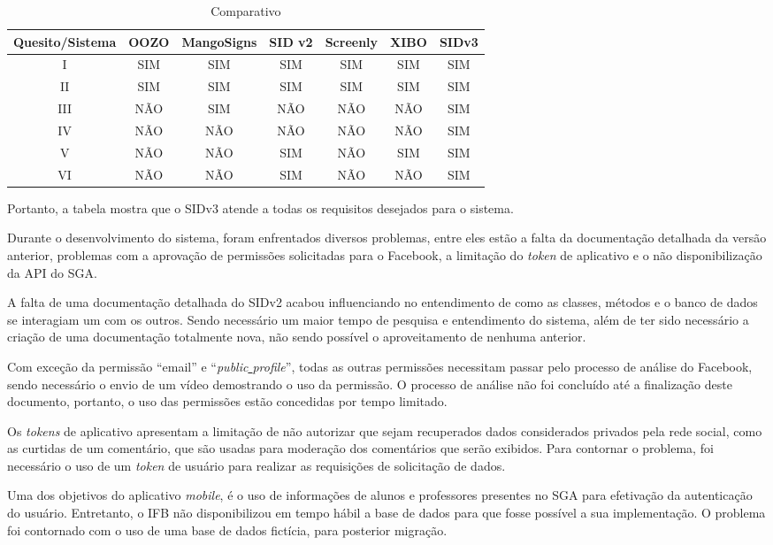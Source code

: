 \begin{table}[h!]
	\caption{Comparativo}
	\label {tlb:comparativo2}
	\centering
	\begin{tabular}{|c|c|c|c|c|c|c|}
		\hline
		Quesito/Sistema & OOZO & MangoSigns & SID v2 & Screenly & XIBO & SIDv3 \\ \hline
		I 				& SIM  & SIM		& SIM & SIM 	 & SIM	& SIM \\ \hline
		II 				& SIM  & SIM 		& SIM & SIM 	 & SIM		& SIM \\ \hline
		III				& NÃO  & SIM 		& NÃO & NÃO 	 & NÃO		& SIM \\ \hline
		IV 				& NÃO  & NÃO 		& NÃO & NÃO 	 & NÃO		& SIM \\ \hline
		V 				& NÃO  & NÃO 		& SIM & NÃO 	 & SIM		& SIM \\ \hline
		VI 				& NÃO  & NÃO 		& SIM & NÃO 	 & NÃO		& SIM \\ \hline
	\end{tabular}
\end{table}

Portanto, a tabela mostra que o SIDv3 atende a todas os requisitos desejados para o sistema.

Durante o desenvolvimento do sistema, foram enfrentados diversos problemas, entre eles estão a falta da documentação detalhada da versão anterior, problemas com a aprovação de permissões solicitadas para o Facebook, a limitação do \textit{token} de aplicativo e o não disponibilização da API do SGA.

A falta de uma documentação detalhada do SIDv2 acabou influenciando no entendimento de como as classes, métodos e o banco de dados se interagiam um com os outros. Sendo necessário um maior tempo de pesquisa e entendimento do sistema, além de ter sido necessário a criação de uma documentação totalmente nova, não sendo possível o aproveitamento de nenhuma anterior.

Com exceção da permissão ``email'' e ``\textit{public\underline{{ }}profile}'', todas as outras permissões necessitam passar pelo processo de análise do Facebook, sendo necessário o envio de um vídeo demostrando o uso da permissão. O processo de análise não foi concluído até a finalização deste documento, portanto, o uso das permissões estão concedidas por tempo limitado.

Os \textit{tokens} de aplicativo apresentam a limitação de não autorizar que sejam recuperados dados considerados privados pela rede social, como as curtidas de um comentário, que são usadas para moderação dos comentários que serão exibidos. Para contornar o problema, foi necessário o uso de um \textit{token} de usuário para realizar as requisições de solicitação de dados.

Uma dos objetivos do aplicativo \textit{mobile}, é o uso de informações de alunos e professores presentes no SGA para efetivação da autenticação do usuário. Entretanto, o IFB não disponibilizou em tempo hábil a base de dados para que fosse possível a sua implementação. O problema foi contornado com o uso de uma base de dados fictícia, para posterior migração. 